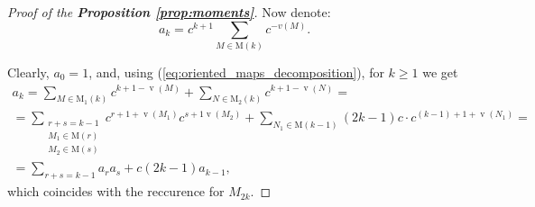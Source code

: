 \documentclass{article}
\newcommand{\apply}[2]{\left\langle#1, #2\right\rangle}
\begin{document}
\begin{proof}[Proof of the \textbf{Proposition \ref{prop:moments}}]
    Now denote:
    $$
        a_k = c^{k + 1}\sum\limits_{M \in \mathrm{M}(k)}c^{-v(M)}.
    $$
    
    Clearly, $a_0 = 1$, and, using (\ref{eq:oriented_maps_decomposition}), for $k \geq 1$ we get
    \begin{multline}
		a_k = \sum\limits_{M \in \mathrm{M_1}(k)}c^{k + 1 - \mathop{v}(M)} + \sum\limits_{N \in \mathrm{M_2}(k)}c^{k + 1 - \mathop{v}(N)} = \\
		 = \sum\limits_{\substack{r + s = k - 1 \\ M_1 \in \mathrm{M}(r) \\ M_2 \in \mathrm{M}(s)}}c^{r + 1 + \mathop{v}(M_1)}c^{s + 1 \mathop{v}(M_2)} + \sum\limits_{N_1 \in \mathrm{M}(k - 1)}(2k - 1)c\cdot c^{(k - 1) + 1 + \mathop{v}(N_1)} = \\
		 = \sum\limits_{r + s = k - 1}a_ra_s + c(2k - 1)a_{k - 1},
    \end{multline}
    which coincides with the reccurence for $M_{2k}$.
\end{proof}





\end{document}
